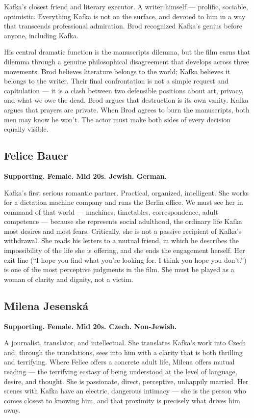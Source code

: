 Kafka's closest friend and literary executor. A writer himself --- prolific, sociable, optimistic. Everything Kafka is not on the surface, and devoted to him in a way that transcends professional admiration. Brod recognized Kafka's genius before anyone, including Kafka.

His central dramatic function is the manuscripts dilemma, but the film earns that dilemma through a genuine philosophical disagreement that develops across three movements. Brod believes literature belongs to the world; Kafka believes it belongs to the writer. Their final confrontation is not a simple request and capitulation --- it is a clash between two defensible positions about art, privacy, and what we owe the dead. Brod argues that destruction is its own vanity. Kafka argues that prayers are private. When Brod agrees to burn the manuscripts, both men may know he won't. The actor must make both sides of every decision equally visible.

\subsection{Felice Bauer}
\textbf{Supporting. Female. Mid 20s. Jewish. German.}

Kafka's first serious romantic partner. Practical, organized, intelligent. She works for a dictation machine company and runs the Berlin office. We must see her in command of that world --- machines, timetables, correspondence, adult competence --- because she represents social adulthood, the ordinary life Kafka most desires and most fears. Critically, she is not a passive recipient of Kafka's withdrawal. She reads his letters to a mutual friend, in which he describes the impossibility of the life she is offering, and she ends the engagement herself. Her exit line (``I hope you find what you're looking for. I think you hope you don't.'') is one of the most perceptive judgments in the film. She must be played as a woman of clarity and dignity, not a victim.

\subsection{Milena Jesenská}
\textbf{Supporting. Female. Mid 20s. Czech. Non-Jewish.}

A journalist, translator, and intellectual. She translates Kafka's work into Czech and, through the translations, sees into him with a clarity that is both thrilling and terrifying. Where Felice offers a concrete adult life, Milena offers mutual reading --- the terrifying ecstasy of being understood at the level of language, desire, and thought. She is passionate, direct, perceptive, unhappily married. Her scenes with Kafka have an electric, dangerous intimacy --- she is the person who comes closest to knowing him, and that proximity is precisely what drives him away.

